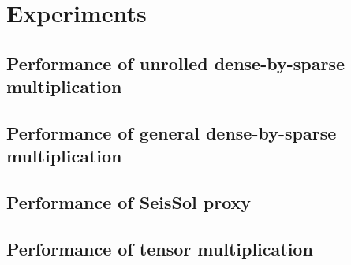 
\chapter{Experiments}
\label{chapter:experiments}


\section{Performance of unrolled dense-by-sparse multiplication}

\section{Performance of general dense-by-sparse multiplication}

\section{Performance of SeisSol proxy}

\section{Performance of tensor multiplication}
